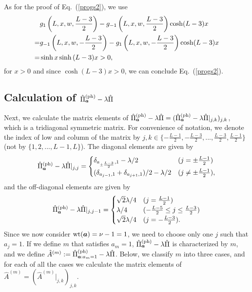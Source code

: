 \documentclass[prl,twocolumn,superscriptaddress,nofootinbib]{revtex4}
\def\U#1{{\rm #1}}
\begin{document}
\begin{widetext}
As for the proof of Eq.~(\ref{progs2}), we use 
\begin{align}
  &g_1\left(L,x,w,\frac{L-3}{2}\right)-g_{-1}\left(L,x,w,\frac{L-3}{2}\right)\cosh(L-3)x\notag\\
  =&g_{-1}\left(L,x,w,-\frac{L-3}{2}\right)-g_1\left(L,x,w,-\frac{L-3}{2}\right)\cosh(L-3)x\notag\\
  =&\sinh{x}\sinh{(L-3)x}>0,
\end{align}
for $x>0$ and since $\cosh(L-3)x>0$, we can conclude Eq.~(\ref{progs2}).


\subsection{Calculation of $\hat{\Pi}^{(\U{ph})}_{{\bm{a}}}-\lambda\hat{\Pi}$}
\label{appCmatrix}    
    Next, we calculate the matrix elements of $\hat{\Pi}^{(\U{ph})}_{{\bm{a}}}-\lambda\hat{\Pi}
      =(\hat{\Pi}^{(\U{ph})}_{{\bm{a}}}-\lambda\hat{\Pi}|_{j,k})_{j,k}$, which is a tridiagonal symmetric matrix.
            For convenience of notation, we denote the index of low and column of the matrix by 
      $j,k\in\{-\frac{L-1}{2},-\frac{L-3}{2},...,\frac{L-3}{2},\frac{L-1}{2}\}$ (not by $\{1,2,...,L-1,L\}$). 
      The diagonal elements are given by
      \begin{align}
        \hat{\Pi}^{(\U{ph})}_{{\bm{a}}}-\lambda\hat{\Pi}|_{j,j}
=
        \begin{cases}
          \delta_{a_{\pm\frac{L-3}{2}},1}-\lambda/2&(j=\pm\frac{L-1}{2})\\
          (\delta_{a_{j-1},1}+\delta_{a_{j+1},1})/2-\lambda/2&(j\neq\pm\frac{L-1}{2}),
                 \label{digA}
          \end{cases}
        \end{align}
and the off-diagonal elements are given by
      \begin{align}
        \hat{\Pi}^{(\U{ph})}_{{\bm{a}}}-\lambda\hat{\Pi}|_{j,j-1}=
        \begin{cases}
          \sqrt{2}\lambda/4&(j=\frac{L-1}{2})\\
          \lambda/4&(-\frac{L-5}{2}\leq j\leq\frac{L-3}{2})\\
                 \sqrt{2}\lambda/4&(j=-\frac{L-3}{2}).
          \label{offA}
        \end{cases}
        \end{align}
      Since we now consider $\U{wt}(\bm{a})=\nu-1=1$, we need to choose only one $j$ such that $a_j=1$. 
      If we define $m$ that satisfies $a_m=1$,      
      $\hat{\Pi}^{(\U{ph})}_{{\bm{a}}}-\lambda\hat{\Pi}$ is characterized by $m$, and we define 
      $\hat{A}^{(m)}:=\hat{\Pi}^{(\U{ph})}_{{\bm{a}}:a_m=1}-\lambda\hat{\Pi}$.
      Below, we classify $m$ into three cases, and for each of all the cases we calculate the matrix elements of
      $\hat{A}^{(m)}=(\hat{A}^{(m)}|_{j,k})_{j,k}$. 


\end{widetext}
\end{document}
